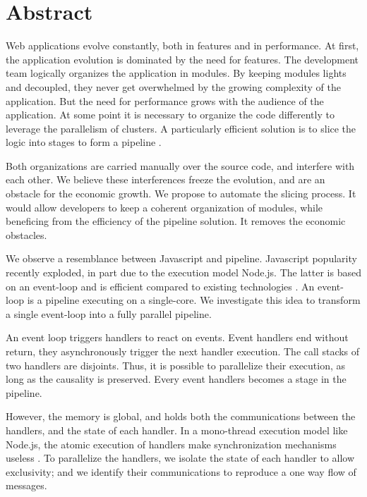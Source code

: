 \section*{Abstract}

Web applications evolve constantly, both in features and in performance.
At first, the application evolution is dominated by the need for features.
The development team logically organizes the application in modules.
By keeping modules lights and decoupled, they never get overwhelmed by the growing complexity of the application.
But the need for performance grows with the audience of the application.
At some point it is necessary to organize the code differently to leverage the parallelism of clusters.
A particularly efficient solution is to slice the logic into stages to form a pipeline \cite{Welsh2000}.

Both organizations are carried manually over the source code, and interfere with each other.
We believe these interferences freeze the evolution, and are an obstacle for the economic growth.
We propose to automate the slicing process.
It would allow developers to keep a coherent organization of modules, while beneficing from the efficiency of the pipeline solution.
It removes the economic obstacles.

We observe a resemblance between Javascript and pipeline.
Javascript popularity recently exploded, in part due to the execution model Node.js.
The latter is based on an event-loop and is efficient compared to existing technologies \cite{Lei2014}.
An event-loop is a pipeline executing on a single-core.
We investigate this idea to transform a single event-loop into a fully parallel pipeline.

An event loop triggers handlers to react on events.
Event handlers end without return, they asynchronously trigger the next handler execution.
The call stacks of two handlers are disjoints.
Thus, it is possible to parallelize their execution, as long as the causality is preserved.
Every event handlers becomes a stage in the pipeline.

However, the memory is global, and holds both the communications between the handlers, and the state of each handler.
In a mono-thread execution model like Node.js, the atomic execution of handlers make synchronization mechanisms useless \cite{Adya2002}.
To parallelize the handlers, %
we isolate the state of each handler to allow exclusivity; and %
we identify their communications to reproduce a one way flow of messages.

